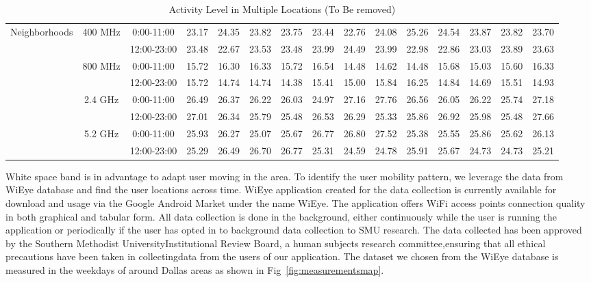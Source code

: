 \begin{table}
\begin{tabular}{|l|c|c|c|c|c|c|c|c|c|c|c|c|c|c|}
\hline	
\multirow{8}{*}{Neighborhoods}	
&\multirow{2}{*}{400 MHz}	
&0:00-11:00 &  23.17 &  24.35 &  23.82 &  23.75 &  23.44 &  22.76&  24.08 &  25.26&  24.54 &  23.87&  23.82 &  23.70 \\ 	
\cline{3-15}	
&&12:00-23:00&  23.48 &  22.67 &  23.53 &  23.48 &  23.99 &  24.49&  23.99 &  22.98&  22.86 &  23.03&  23.89 &  23.63 \\ 	
\cline{2-15}	
&\multirow{2}{*}{800 MHz}	
&0:00-11:00 &  15.72 &  16.30 &  16.33 &  15.72 &  16.54 &  14.48&  14.62 &  14.48&  15.68 &  15.03&  15.60 &  16.33 \\ 	
\cline{3-15}	
&&12:00-23:00&  15.72 &  14.74 &  14.74 &  14.38 &  15.41 &  15.00&  15.84 &  16.25&  14.84 &  14.69&  15.51 &  14.93 \\ 	
\cline{2-15}	
&\multirow{2}{*}{2.4 GHz}	
&0:00-11:00 &  26.49 &  26.37 &  26.22 &  26.03 &  24.97 &  27.16&  27.76 &  26.56&  26.05 &  26.22&  25.74 &  27.18 \\ 	
\cline{3-15}	
&&12:00-23:00&  27.01 &  26.34 &  25.79 &  25.48 &  26.53 &  26.29&  25.33 &  25.86&  26.92 &  25.98&  25.48 &  27.66 \\ 	
\cline{2-15}	
&\multirow{2}{*}{5.2 GHz}	
&0:00-11:00 &  25.93 &  26.27 &  25.07 &  25.67 &  26.77 &  26.80&  27.52 &  25.38&  25.55 &  25.86&  25.62 &  26.13 \\ 	
\cline{3-15}	
&&12:00-23:00&  25.29 &  26.49 &  26.70 &  26.77 &  25.31 &  24.59&  24.78 &  25.91&  25.67 &  24.73&  24.73 &  25.21 \\ 	
\hline	
\end{tabular}    
\caption{Activity Level in Multiple Locations (To Be removed)} %
\label{tab:activitymeasurement}    
\vspace{-0.3in}
\end{table}    












White space band is in advantage to adapt user moving in the area. To identify the user mobility pattern, we leverage 
the data from WiEye database and find the user locations across time.
WiEye application created for the data collection is currently available for download and usage via the Google Android 
Market under the name WiEye. The application offers WiFi access points connection quality in both graphical and tabular 
form. All data collection is done in the background, either continuously while the user is running the application or 
periodically if the user has opted in to background data collection to SMU research. 
The data collected has been approved by the Southern Methodist UniversityInstitutional Review Board, a human subjects 
research committee,ensuring that all ethical precautions have been taken in collectingdata from the users of our 
application.
The dataset we chosen from the WiEye database is measured in the weekdays of around Dallas areas as shown in Fig~\ref{fig:measurementsmap}.



